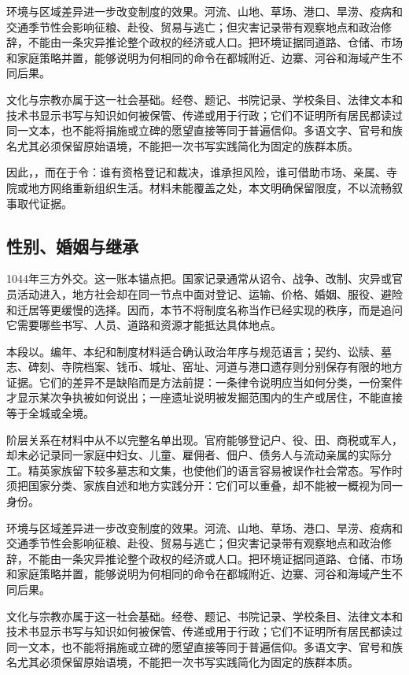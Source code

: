 环境与区域差异进一步改变制度的效果。河流、山地、草场、港口、旱涝、疫病和交通季节性会影响征粮、赴役、贸易与逃亡；但灾害记录带有观察地点和政治修辞，不能由一条灾异推论整个政权的经济或人口。把环境证据同道路、仓储、市场和家庭策略并置，能够说明为何相同的命令在都城附近、边寨、河谷和海域产生不同后果。

文化与宗教亦属于这一社会基础。经卷、题记、书院记录、学校条目、法律文本和技术书显示书写与知识如何被保管、传递或用于行政；它们不证明所有居民都读过同一文本，也不能将捐施或立碑的愿望直接等同于普遍信仰。多语文字、官号和族名尤其必须保留原始语境，不能把一次书写实践简化为固定的族群本质。

因此，，而在于令：谁有资格登记和裁决，谁承担风险，谁可借助市场、亲属、寺院或地方网络重新组织生活。材料未能覆盖之处，本文明确保留限度，不以流畅叙事取代证据。

\subsection{性别、婚姻与继承}

1044年三方外交。这一账本锚点把。国家记录通常从诏令、战争、改制、灾异或官员活动进入，地方社会却在同一节点中面对登记、运输、价格、婚姻、服役、避险和迁居等更缓慢的选择。因而，本节不将制度名称当作已经实现的秩序，而是追问它需要哪些书写、人员、道路和资源才能抵达具体地点。

本段以。编年、本纪和制度材料适合确认政治年序与规范语言；契约、讼牍、墓志、碑刻、寺院档案、钱币、城址、窑址、河道与港口遗存则分别保存有限的地方证据。它们的差异不是缺陷而是方法前提：一条律令说明应当如何分类，一份案件才显示某次争执被如何说出；一座遗址说明被发掘范围内的生产或居住，不能直接等于全城或全境。

阶层关系在材料中从不以完整名单出现。官府能够登记户、役、田、商税或军人，却未必记录同一家庭中妇女、儿童、雇佣者、佃户、债务人与流动亲属的实际分工。精英家族留下较多墓志和文集，也使他们的语言容易被误作社会常态。写作时须把国家分类、家族自述和地方实践分开：它们可以重叠，却不能被一概视为同一身份。

环境与区域差异进一步改变制度的效果。河流、山地、草场、港口、旱涝、疫病和交通季节性会影响征粮、赴役、贸易与逃亡；但灾害记录带有观察地点和政治修辞，不能由一条灾异推论整个政权的经济或人口。把环境证据同道路、仓储、市场和家庭策略并置，能够说明为何相同的命令在都城附近、边寨、河谷和海域产生不同后果。

文化与宗教亦属于这一社会基础。经卷、题记、书院记录、学校条目、法律文本和技术书显示书写与知识如何被保管、传递或用于行政；它们不证明所有居民都读过同一文本，也不能将捐施或立碑的愿望直接等同于普遍信仰。多语文字、官号和族名尤其必须保留原始语境，不能把一次书写实践简化为固定的族群本质。

